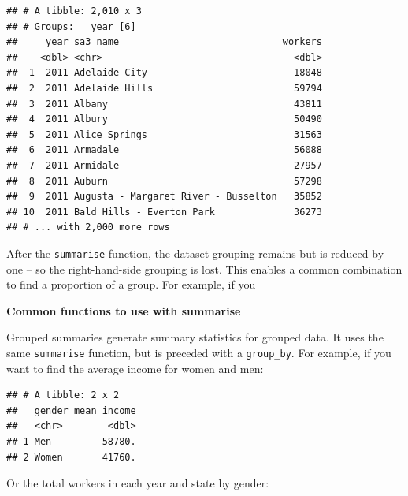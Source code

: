 \documentclass[]{book}
\newenvironment{Shaded}{\begin{snugshade}}{\end{snugshade}}
\newcommand{\DataTypeTok}[1]{\textcolor[rgb]{0.13,0.29,0.53}{#1}}
\newcommand{\KeywordTok}[1]{\textcolor[rgb]{0.13,0.29,0.53}{\textbf{#1}}}
\newcommand{\NormalTok}[1]{#1}
\newcommand{\OperatorTok}[1]{\textcolor[rgb]{0.81,0.36,0.00}{\textbf{#1}}}
\newcommand{\StringTok}[1]{\textcolor[rgb]{0.31,0.60,0.02}{#1}}
\begin{document}
\begin{verbatim}
## # A tibble: 2,010 x 3
## # Groups:   year [6]
##     year sa3_name                             workers
##    <dbl> <chr>                                  <dbl>
##  1  2011 Adelaide City                          18048
##  2  2011 Adelaide Hills                         59794
##  3  2011 Albany                                 43811
##  4  2011 Albury                                 50490
##  5  2011 Alice Springs                          31563
##  6  2011 Armadale                               56088
##  7  2011 Armidale                               27957
##  8  2011 Auburn                                 57298
##  9  2011 Augusta - Margaret River - Busselton   35852
## 10  2011 Bald Hills - Everton Park              36273
## # ... with 2,000 more rows
\end{verbatim}

After the \texttt{summarise} function, the dataset grouping remains but is reduced by one -- so the right-hand-side grouping is lost. This enables a common combination to find a proportion of a group. For example, if you

\textbf{Common functions to use with summarise}

Grouped summaries generate summary statistics for grouped data. It uses the same \texttt{summarise} function, but is preceded with a \texttt{group\_by}. For example, if you want to find the average income for women and men:

\begin{Shaded}
\end{Shaded}

\begin{verbatim}
## # A tibble: 2 x 2
##   gender mean_income
##   <chr>        <dbl>
## 1 Men         58780.
## 2 Women       41760.
\end{verbatim}

Or the total workers in each year and state by gender:

\begin{Shaded}
\end{Shaded}
\end{document}
